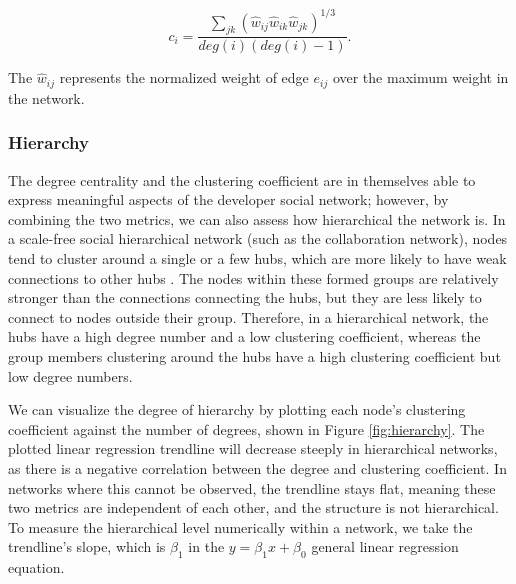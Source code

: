 \[ c_i = \frac{\sum_{jk}(\hat{w}_{ij}\hat{w}_{ik}\hat{w}_{jk})^{1/3}}{deg(i)(deg(i)-1)}. \]

The $\hat{w}_{ij}$ represents the normalized weight of edge $e_{ij}$ over the maximum weight in the network.

\subsubsection{Hierarchy}
\label{sec:hierarchy}

The degree centrality and the clustering coefficient are in themselves able to express meaningful aspects of the developer social network; however, by combining the two metrics, we can also assess how hierarchical the network is. In a scale-free social hierarchical network (such as the collaboration network), nodes tend to cluster around a single or a few hubs, which are more likely to have weak connections to other hubs \cite{ravaszHierarchicalOrganizationComplex2003, joblinEvolutionaryTrendsDeveloper2017}. The nodes within these formed groups are relatively stronger than the connections connecting the hubs, but they are less likely to connect to nodes outside their group. Therefore, in a hierarchical network, the hubs have a high degree number and a low clustering coefficient, whereas the group members clustering around the hubs have a high clustering coefficient but low degree numbers.

We can visualize the degree of hierarchy by plotting each node's clustering coefficient against the number of degrees, shown in Figure \ref{fig:hierarchy}. The plotted linear regression trendline will decrease steeply in hierarchical networks, as there is a negative correlation between the degree and clustering coefficient. In networks where this cannot be observed, the trendline stays flat, meaning these two metrics are independent of each other, and the structure is not hierarchical. To measure the hierarchical level numerically within a network, we take the trendline's slope, which is $\beta_1$ in the $y=\beta_1x + \beta_0$ general linear regression equation.

